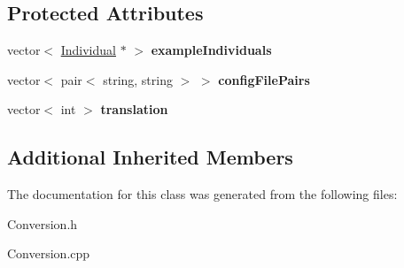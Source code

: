 \subsection*{Protected Attributes}
\begin{DoxyCompactItemize}
\item 
\mbox{\label{classConversion_a2d748437e36c3487bd93f1242752ce50}} 
vector$<$ \mbox{\hyperlink{classIndividual}{Individual}} $\ast$ $>$ {\bfseries example\+Individuals}
\item 
\mbox{\label{classConversion_afc36a1c64fce3bf85a76bd81456298b1}} 
vector$<$ pair$<$ string, string $>$ $>$ {\bfseries config\+File\+Pairs}
\item 
\mbox{\label{classConversion_af1281db59d6b9de9d06c209221884104}} 
vector$<$ int $>$ {\bfseries translation}
\end{DoxyCompactItemize}
\subsection*{Additional Inherited Members}


The documentation for this class was generated from the following files\+:\begin{DoxyCompactItemize}
\item 
Conversion.\+h\item 
Conversion.\+cpp\end{DoxyCompactItemize}

